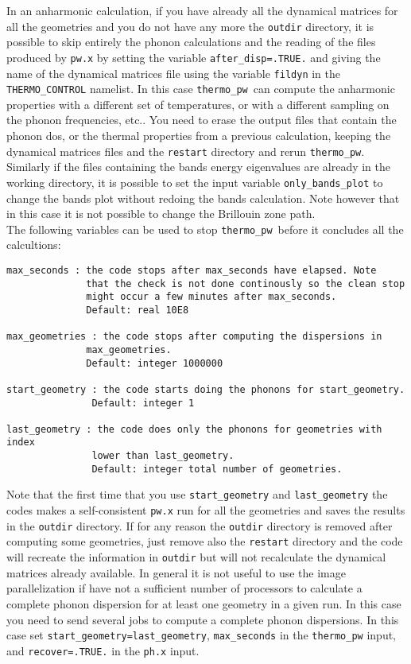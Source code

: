 \documentclass[12pt,a4paper]{article}
\def\thermo{\texttt{thermo\_pw}}
\begin{document}
In an anharmonic calculation, if you have already all the dynamical 
matrices for all the geometries and you do not have any more the
\texttt{outdir} directory, it is possible to skip entirely
the phonon calculations and the reading of the files produced by
\texttt{pw.x} by setting the variable
\texttt{after\_disp=.TRUE.} and giving the name of the dynamical matrices file
using the variable \texttt{fildyn} in the \texttt{THERMO\_CONTROL} namelist. 
In this case \thermo\ can compute the anharmonic properties with a 
different set 
of temperatures, or with a different sampling on the phonon frequencies, 
etc.. You need to erase the output files that contain
the phonon dos, or the thermal properties from a previous calculation, keeping 
the dynamical matrices files and the \texttt{restart} directory and 
rerun \thermo.
Similarly if the files containing the bands energy eigenvalues are already
in the working directory, it is possible to set the input variable
\texttt{only\_bands\_plot} to change the bands plot without redoing the
bands calculation. Note however that in this case it is not possible 
to change the Brillouin zone path. \\
The following variables can be used to stop \thermo\ before it concludes all
the calcultions:
\begin{verbatim}
max_seconds : the code stops after max_seconds have elapsed. Note
              that the check is not done continously so the clean stop
              might occur a few minutes after max_seconds.
              Default: real 10E8

max_geometries : the code stops after computing the dispersions in 
              max_geometries.
              Default: integer 1000000

start_geometry : the code starts doing the phonons for start_geometry.
               Default: integer 1

last_geometry : the code does only the phonons for geometries with index 
               lower than last_geometry.
               Default: integer total number of geometries.
\end{verbatim}
Note that the first time that you use \texttt{start\_geometry} and 
\texttt{last\_geometry} the codes makes a self-consistent \texttt{pw.x} 
run for all the geometries and saves the results in the \texttt{outdir}
directory. If for any reason the \texttt{outdir} directory is removed 
after computing some geometries, just remove also the
\texttt{restart} directory and the code will recreate the information
in \texttt{outdir} but will not recalculate the dynamical matrices 
already available. In general it is not useful to use the image parallelization
if have not a sufficient number of processors to calculate a complete
phonon dispersion for at least one geometry in a given run. In this case
you need to send several jobs to compute a complete phonon dispersions.
In this case set \texttt{start\_geometry=last\_geometry},  
\texttt{max\_seconds} in the \texttt{thermo\_pw} input, 
and \texttt{recover=.TRUE.} in the \texttt{ph.x} input.
\end{document}
